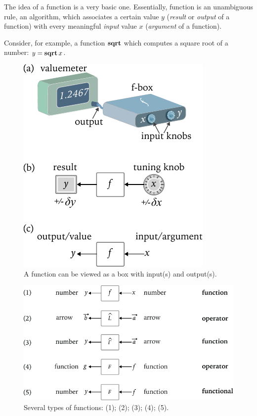 The idea of a function is a very basic one. Essentially, function is an unambiguous rule, an algorithm, which associates a certain value $y$ (\emph{result} or \emph{output} of a function) with every meaningful \emph{input} value $x$ (\emph{argument} of a function). 

Consider, for example, a function $\textrm{\bf {sqrt}}$ which computes a square root of a number: $y=\textrm{\bf {sqrt}}\,x$.


\begin{figure}[htbp]
	\centering
	\includegraphics[scale=1.0]{functionAsBox}
	\caption{A function can be viewed as a box with input(s) and output(s).}
	\label{fig:functionAsBox}
\end{figure}


\begin{figure}[htbp]
	\centering
	\includegraphics[scale=1.0]{functionTypes}
	\caption{Several types of functions: (1); (2); (3); (4); (5).}
	\label{fig:functionTypes}
\end{figure}

